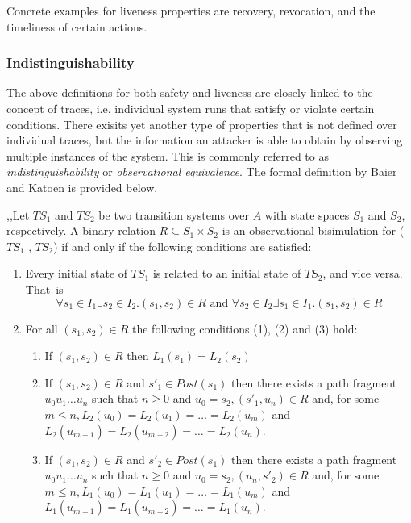 Concrete examples for liveness properties are recovery, revocation, and the timeliness of certain actions.

\subsubsection{Indistinguishability}

The above definitions for both safety and liveness are closely linked to the concept of traces, i.e. individual system runs that satisfy or violate certain conditions.
There exisits yet another type of properties that is not defined over individual traces, but the information an attacker is able to obtain by observing multiple instances of the system.
This is commonly referred to as \textit{indistinguishability} or \textit{observational equivalence}.
The formal definition by Baier and Katoen is provided below.

,,Let $TS_1$ and $TS_2$ be two transition systems over $A$ with state spaces $S_1$ and $S_2$, respectively.
A binary relation $R \subseteq S_1 \times S_2$ is an
observational bisimulation for ($TS_1$ , $TS_2$) if and only if the following conditions are satisfied:

\begin{enumerate}[label=(\Alph*)]
    \item Every initial state of $TS_1$ is related to an initial state of $TS_2$, and vice versa. That~is
    \begin{equation*}
        \forall s_1 \in I_1 \exists s_2 \in I_2. (s_1, s_2) \in R \text{ and } \forall s_2 \in I_2 \exists s_1 \in I_1. (s_1, s_2) \in R
    \end{equation*}
    \item For all $(s_1, s_2) \in R$ the following conditions (1), (2) and (3) hold:
    \begin{enumerate}[label=(\arabic*)]
        \item If $(s_1, s_2) \in R$ then $L_1 (s_1) = L_2 (s_2)$
        \item If $(s_1, s_2) \in R$ and $s'_1 \in Post(s_1)$ then there exists a path fragment $u_0 u_1 \ldots u_n$ such that $n \geq 0$ and $u_0 = s_2, (s'_1, u_n) \in R$ and, for some $m \leq n, L_2(u_0) = L_2(u_1) = \ldots = L_2(u_m)$ and $L_2(u_{m+1}) = L_2(u_{m+2}) = \ldots = L_2(u_n)$.
        \item If $(s_1, s_2) \in R$ and $s'_2 \in Post(s_1)$ then there exists a path fragment $u_0 u_1 \ldots u_n$ such that $n \geq 0$ and $u_0 = s_2, (u_n, s'_2) \in R$ and, for some $m \leq n, L_1(u_0) = L_1(u_1) = \ldots = L_1 (u_m )$
and $L_1(u_{m+1}) = L_1(u_{m+2}) = \ldots = L_1 (u_n)$.
    \end{enumerate}
\end{enumerate}

